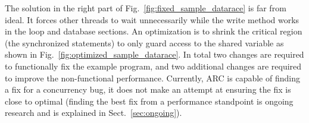 The solution in the right part of Fig.~\ref{fig:fixed_sample_datarace} is far
from ideal. It forces other threads to wait unnecessarily while the write
method works in the loop and database sections. An optimization is to shrink
the critical region (the synchronized statements) to only guard access to the
shared variable as shown in Fig.~\ref{fig:optimized_sample_datarace}.
In total two changes
are required to functionally fix the example program, and two additional
changes are required to improve the non-functional performance.%
Currently, ARC is capable of finding a fix for a concurrency bug, it does not make an
attempt at ensuring the fix is close to optimal (finding the best fix from a performance standpoint is ongoing research and is explained in Sect.~\ref{sec:ongoing}).

